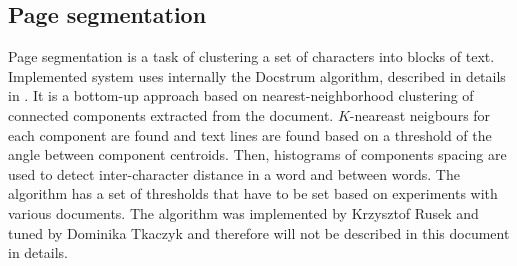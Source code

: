\subsection{Page segmentation}\label{sec:page_segmentation}
Page segmentation is a task of clustering a set of characters into blocks of text. Implemented system uses internally the Docstrum algorithm, described in details in \cite{O'Gorman1993}. It is a bottom-up approach based on
nearest-neighborhood clustering of connected components extracted from the document. $K$-neareast neigbours for each component are found and text lines are found based on a threshold of the angle between component centroids. Then, histograms of components spacing are used to detect inter-character distance in a word and between words. The algorithm has a set of thresholds that have to be set based on experiments with various documents. The algorithm was implemented by Krzysztof Rusek and tuned by Dominika Tkaczyk and therefore will not be described in this document in details.

